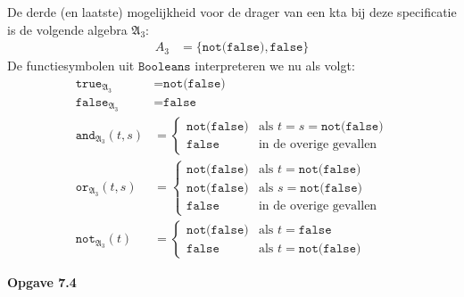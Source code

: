 \documentclass[a4paper,11pt]{article}
\begin{document}
\begin{enumerate}
De derde (en laatste) mogelijkheid voor de drager van een kta bij deze
specificatie is de volgende algebra $\mathfrak{A}_{3}$:
\begin{align*}
A_{3} &= \{\texttt{not(false)}, \texttt{false}\}
\end{align*}
De functiesymbolen uit $\texttt{Booleans}$ interpreteren we nu als volgt:
\begin{align*}
\texttt{true}_{\mathfrak{A}_{3}}     &= \texttt{not(false)} \\
\texttt{false}_{\mathfrak{A}_{3}}    &= \texttt{false} \\
\texttt{and}_{\mathfrak{A}_{3}}(t,s) &= \begin{cases}
  \texttt{not(false)} & \text{als $t = s = \texttt{not(false)}$} \\
  \texttt{false}      & \text{in de overige gevallen}
\end{cases} \\
\texttt{or}_{\mathfrak{A}_{3}}(t,s) &= \begin{cases}
  \texttt{not(false)} & \text{als $t = \texttt{not(false)}$} \\
  \texttt{not(false)} & \text{als $s = \texttt{not(false)}$} \\
  \texttt{false}      & \text{in de overige gevallen}
\end{cases} \\
\texttt{not}_{\mathfrak{A}_{3}}(t) &= \begin{cases}
  \texttt{not(false)} & \text{als $t = \texttt{false}$} \\
  \texttt{false}      & \text{als $t = \texttt{not(false)}$}
\end{cases}
\end{align*}

\end{enumerate}


{\bf Opgave 7.4}
\end{document}
